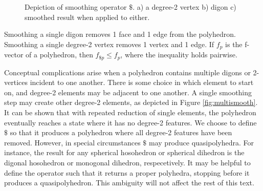\documentclass{amsart}[12pt]
\begin{document}
\begin{figure}

\caption{Depiction of smoothing operator $\$$. a) a degree-2 vertex b) digon c)
        smoothed result when applied to either.}
\label{fig:smooth}
\end{figure}

Smoothing a single digon removes 1 face and 1 edge from the polyhedron.
Smoothing a single degree-2 vertex removes 1 vertex and 1 edge.
If $f_p$ is the f-vector of a polyhedron, then $f_{\$p} \le f_p$, where the
inequality holds pairwise.

Conceptual complications arise when a polyhedron contains multiple digons or
2-vertices incident to one another. There is some choice in which element to
start on, and degree-2 elements may be adjacent to one another. A single
smoothing step may create other degree-2 elements, as depicted in Figure
\ref{fig:multismooth}. It can be shown that with repeated reduction of single
elements, the polyhedron eventually reaches a state where it has no degree-2
features. We choose to define $\$$ so that it produces a polyhedron where all
degree-2 features have been removed. However, in special circumstances $\$$ may
produce quasipolyhedra. For instance, the result for any spherical hosohedron
or spherical dihedron is the digonal hosohedron or monogonal dihedron,
respecetively. It may be helpful to define the operator such that it returns a
proper polyhedra, stopping before it produces a quasipolyhedron.
This ambiguity will not affect the rest of this text.
\end{document}
